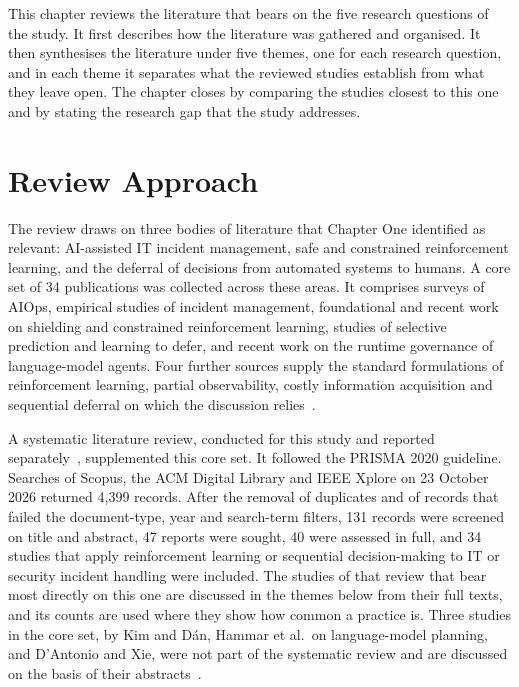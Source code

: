 

This chapter reviews the literature that bears on the five research questions of the study. It first describes how the literature was gathered and organised. It then synthesises the literature under five themes, one for each research question, and in each theme it separates what the reviewed studies establish from what they leave open. The chapter closes by comparing the studies closest to this one and by stating the research gap that the study addresses.

\section{Review Approach}

The review draws on three bodies of literature that Chapter One identified as relevant: AI-assisted IT incident management, safe and constrained reinforcement learning, and the deferral of decisions from automated systems to humans. A core set of 34 publications was collected across these areas. It comprises surveys of AIOps, empirical studies of incident management, foundational and recent work on shielding and constrained reinforcement learning, studies of selective prediction and learning to defer, and recent work on the runtime governance of language-model agents. Four further sources supply the standard formulations of reinforcement learning, partial observability, costly information acquisition and sequential deferral on which the discussion relies~\cite{sutton2018,kaelbling1998,janisch2019,joshi2023}.

A systematic literature review, conducted for this study and reported separately~\cite{opol2026slr}, supplemented this core set. It followed the PRISMA 2020 guideline. Searches of Scopus, the ACM Digital Library and IEEE Xplore on 23 October 2026 returned 4,399 records. After the removal of duplicates and of records that failed the document-type, year and search-term filters, 131 records were screened on title and abstract, 47 reports were sought, 40 were assessed in full, and 34 studies that apply reinforcement learning or sequential decision-making to IT or security incident handling were included. The studies of that review that bear most directly on this one are discussed in the themes below from their full texts, and its counts are used where they show how common a practice is. Three studies in the core set, by Kim and D\'{a}n, Hammar et al.\ on language-model planning, and D'Antonio and Xie, were not part of the systematic review and are discussed on the basis of their abstracts~\cite{kim2025,hammar2026llm,dantonio2025}.

